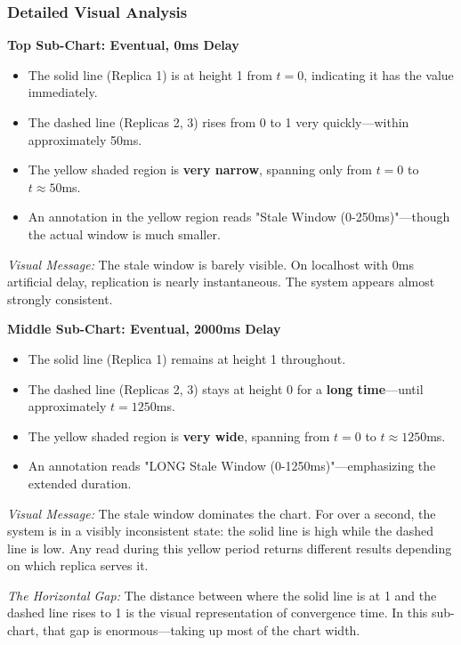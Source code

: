 \documentclass[10pt,a4paper]{article}
\begin{document}
\subsubsection{Detailed Visual Analysis}

\textbf{Top Sub-Chart: Eventual, 0ms Delay}

\begin{itemize}
    \item The solid line (Replica 1) is at height 1 from $t=0$, indicating it has the value immediately.
    \item The dashed line (Replicas 2, 3) rises from 0 to 1 very quickly---within approximately 50ms.
    \item The yellow shaded region is \textbf{very narrow}, spanning only from $t=0$ to $t \approx 50$ms.
    \item An annotation in the yellow region reads "Stale Window (0-250ms)"---though the actual window is much smaller.
\end{itemize}

\textit{Visual Message:} The stale window is barely visible. On localhost with 0ms artificial delay, replication is nearly instantaneous. The system appears almost strongly consistent.

\textbf{Middle Sub-Chart: Eventual, 2000ms Delay}

\begin{itemize}
    \item The solid line (Replica 1) remains at height 1 throughout.
    \item The dashed line (Replicas 2, 3) stays at height 0 for a \textbf{long time}---until approximately $t=1250$ms.
    \item The yellow shaded region is \textbf{very wide}, spanning from $t=0$ to $t \approx 1250$ms.
    \item An annotation reads "LONG Stale Window (0-1250ms)"---emphasizing the extended duration.
\end{itemize}

\textit{Visual Message:} The stale window dominates the chart. For over a second, the system is in a visibly inconsistent state: the solid line is high while the dashed line is low. Any read during this yellow period returns different results depending on which replica serves it.

\textit{The Horizontal Gap:} The distance between where the solid line is at 1 and the dashed line rises to 1 is the visual representation of convergence time. In this sub-chart, that gap is enormous---taking up most of the chart width.
\end{document}
